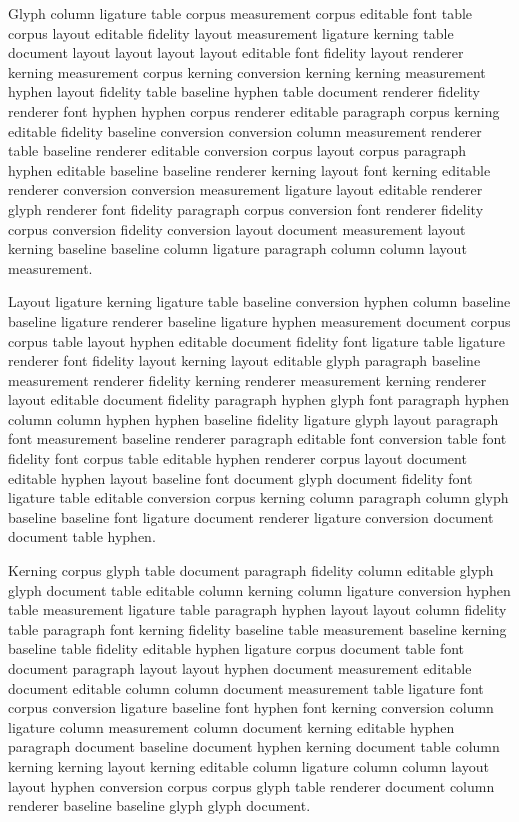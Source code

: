 Glyph column ligature table corpus measurement corpus editable font table corpus layout editable fidelity layout measurement ligature kerning table document layout layout layout layout editable font fidelity layout renderer kerning measurement corpus kerning conversion kerning kerning measurement hyphen layout fidelity table baseline hyphen table document renderer fidelity renderer font hyphen hyphen corpus renderer editable paragraph corpus kerning editable fidelity baseline conversion conversion column measurement renderer table baseline renderer editable conversion corpus layout corpus paragraph hyphen editable baseline baseline renderer kerning layout font kerning editable renderer conversion conversion measurement ligature layout editable renderer glyph renderer font fidelity paragraph corpus conversion font renderer fidelity corpus conversion fidelity conversion layout document measurement layout kerning baseline baseline column ligature paragraph column column layout measurement.

Layout ligature kerning ligature table baseline conversion hyphen column baseline baseline ligature renderer baseline ligature hyphen measurement document corpus corpus table layout hyphen editable document fidelity font ligature table ligature renderer font fidelity layout kerning layout editable glyph paragraph baseline measurement renderer fidelity kerning renderer measurement kerning renderer layout editable document fidelity paragraph hyphen glyph font paragraph hyphen column column hyphen hyphen baseline fidelity ligature glyph layout paragraph font measurement baseline renderer paragraph editable font conversion table font fidelity font corpus table editable hyphen renderer corpus layout document editable hyphen layout baseline font document glyph document fidelity font ligature table editable conversion corpus kerning column paragraph column glyph baseline baseline font ligature document renderer ligature conversion document document table hyphen.

Kerning corpus glyph table document paragraph fidelity column editable glyph glyph document table editable column kerning column ligature conversion hyphen table measurement ligature table paragraph hyphen layout layout column fidelity table paragraph font kerning fidelity baseline table measurement baseline kerning baseline table fidelity editable hyphen ligature corpus document table font document paragraph layout layout hyphen document measurement editable document editable column column document measurement table ligature font corpus conversion ligature baseline font hyphen font kerning conversion column ligature column measurement column document kerning editable hyphen paragraph document baseline document hyphen kerning document table column kerning kerning layout kerning editable column ligature column column layout layout hyphen conversion corpus corpus glyph table renderer document column renderer baseline baseline glyph glyph document.

